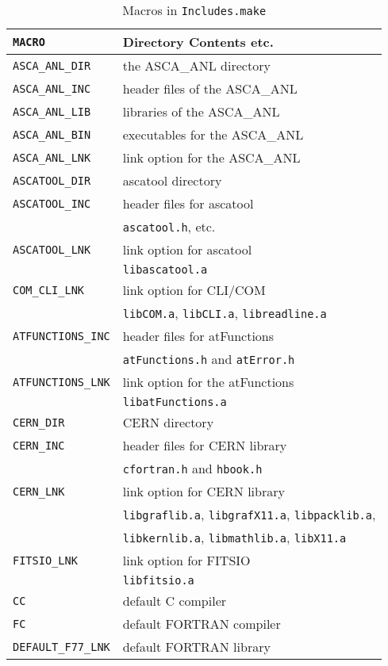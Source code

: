 \begin{table}[htb]
\begin{center}
\begin{tabular}{ll}
\hline
   {\tt MACRO} & Directory Contents etc.\\
\hline
   {\tt ASCA\_ANL\_DIR}	& the ASCA\_ANL directory \\
   {\tt ASCA\_ANL\_INC}	& header files of the ASCA\_ANL \\
   {\tt ASCA\_ANL\_LIB}	& libraries of the ASCA\_ANL \\
   {\tt ASCA\_ANL\_BIN}	& executables for the ASCA\_ANL \\
   {\tt ASCA\_ANL\_LNK} & link option for the ASCA\_ANL \\
   {\tt ASCATOOL\_DIR}	& ascatool directory \\
   {\tt ASCATOOL\_INC}	& header files for ascatool \\
	& {\tt ascatool.h}, etc. \\
   {\tt ASCATOOL\_LNK}  & link option for ascatool\\
	& {\tt libascatool.a} \\
   {\tt COM\_CLI\_LNK}  & link option for CLI/COM \\
	& {\tt libCOM.a}, {\tt libCLI.a}, {\tt libreadline.a} \\
   {\tt ATFUNCTIONS\_INC}& header files for atFunctions \\
	& {\tt atFunctions.h} and {\tt atError.h} \\
   {\tt ATFUNCTIONS\_LNK} & link option for the atFunctions \\
	& {\tt libatFunctions.a} \\
   {\tt CERN\_DIR}	& CERN directory \\
   {\tt CERN\_INC}	& header files for CERN library \\
	& {\tt cfortran.h} and {\tt hbook.h} \\
   {\tt CERN\_LNK}      & link option for CERN library \\
	& {\tt libgraflib.a}, {\tt libgrafX11.a}, {\tt libpacklib.a}, \\
	& {\tt libkernlib.a}, {\tt libmathlib.a}, {\tt libX11.a} \\
   {\tt FITSIO\_LNK}    & link option for FITSIO \\
	& {\tt libfitsio.a} \\
   {\tt CC}             & default C compiler \\
   {\tt FC}             & default FORTRAN compiler \\
   {\tt DEFAULT\_F77\_LNK} & default FORTRAN library \\
\hline
\end{tabular}
\caption{Macros in {\tt Includes.make}}
\label{tab:includes_make}
\end{center}
\end{table}

